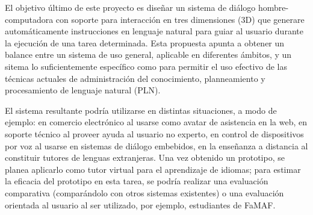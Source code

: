 El objetivo \'ultimo de este proyecto es dise\~nar un sistema de di\'alogo hombre-computadora con soporte para interacci\'on en tres dimensiones (3D) que generare autom\'aticamente instrucciones en lenguaje natural para guiar  al usuario durante la ejecuci\'on de una tarea determinada. Esta propuesta apunta
a obtener un balance entre un sistema de uso general, aplicable en
diferentes \'ambitos, y un sitema lo suficientemente espec\'ifico
como para permitir el uso efectivo de las t\'ecnicas actuales de
administraci\'on del conocimiento, planneamiento y procesamiento de lenguaje natural (PLN).

El sistema resultante podr\'ia utilizarse en distintas situaciones, a modo de ejemplo:
en comercio electr\'onico  al usarse como avatar de asistencia en la web, en soporte t\'ecnico al proveer ayuda al usuario no experto, en
control de dispositivos por voz al usarse en sistemas de di\'alogo embebidos,
en la ense\~nanza a distancia al constituir tutores de lenguas extranjeras.  Una vez obtenido
un prototipo, se planea aplicarlo  como
tutor virtual para el aprendizaje de idiomas; para estimar la eficacia del prototipo  en esta tarea, se podr\'ia realizar una evaluaci\'on comparativa (compar\'andolo con otros sistemas existentes) o una evaluaci\'on orientada al usuario al ser utilizado, por ejemplo, estudiantes de FaMAF.


